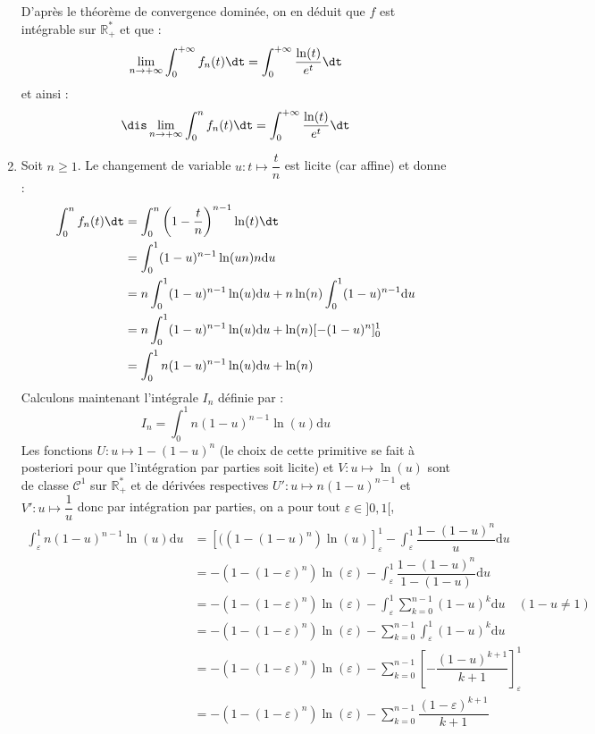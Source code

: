 \documentclass[a4paper,10pt]{report}
\begin{document}
\begin{enumerate}
\begin{itemize}
\end{itemize}
D'après le théorème de convergence dominée, on en déduit que $f$ est intégrable sur $\mathbb{R}_+^{*}$ et que :
$$ \lim_{n \rightarrow + \infty} \int_{0}^{+ \infty} f_n(t) \dt = \int_{0}^{+ \infty} \dfrac{\ln(t)}{e^t} \dt$$
et ainsi :
$$\dis \lim_{n \rightarrow + \infty} \int_{0}^n f_n(t) \dt = \int_{0}^{+ \infty} \dfrac{\ln(t)}{e^t} \dt$$
\item Soit $n \geq 1$. Le changement de variable $u : t \mapsto \dfrac{t}{n}$ est licite (car affine) et donne :
\begin{align*}
\int_{0}^n f_n(t) \dt & = \int_{0}^n \left(1 - \dfrac{t}{n}\right)^{n-1} \ln(t) \dt \\
& = \int_{0}^1  (1-u)^{n-1} \ln(un) n \textrm{d}u \\
& = n \int_{0}^1  (1-u)^{n-1} \ln(u) \textrm{d}u  +  n\ln(n) \int_{0}^1  (1-u)^{n-1} \textrm{d}u \\
& = n \int_{0}^1  (1-u)^{n-1} \ln(u) \textrm{d}u +  \ln(n) [-(1-u)^n ]_0^1 \\
& =  \int_{0}^1 n (1-u)^{n-1} \ln(u) \textrm{d}u +  \ln(n) 
\end{align*}
Calculons maintenant l'intégrale $I_n$ définie par :
$$ I_n = \int_{0}^1  n(1-u)^{n-1} \ln(u) \textrm{d}u$$
Les fonctions $U : u \mapsto 1-(1-u)^n$ (le choix de cette primitive se fait à posteriori pour que l'intégration par parties soit licite) et $V : u \mapsto \ln(u)$ sont de classe $\mathcal{C}^1$ sur $\mathbb{R}_+^{*}$ et de dérivées respectives $U' : u \mapsto n(1-u)^{n-1}$ et $V' : u \mapsto \dfrac{1}{u}$ donc par intégration par parties, on a pour tout $\varepsilon \in ]0,1[$,
\begin{align*}
 \int_{\varepsilon}^1 n (1-u)^{n-1} \ln(u) \textrm{d}u & = [((1-(1-u)^n)\ln(u)]_{\varepsilon}^1 - \int_{\varepsilon}^1 \dfrac{1-(1-u)^n}{u} \textrm{d}u \\
 & = -(1-(1- \varepsilon)^n)\ln(\varepsilon) - \int_{\varepsilon}^1 \dfrac{1-(1-u)^n}{1-(1-u)} \textrm{d}u \\ 
 & = -(1-(1- \varepsilon)^n)\ln(\varepsilon)  - \int_{\varepsilon}^1  \sum_{k=0}^{n-1} (1-u)^k \textrm{d}u  \quad (1-u \neq 1) \\ 
 & = -(1-(1- \varepsilon)^n)\ln(\varepsilon)  - \sum_{k=0}^{n-1} \int_{\varepsilon}^1   (1-u)^k \textrm{d}u \\ 
 & = -(1-(1- \varepsilon)^n)\ln(\varepsilon)  - \sum_{k=0}^{n-1} \left[ -\dfrac{(1-u)^{k+1}}{k+1}\right]_{\varepsilon}^1 \\
 & = -(1-(1- \varepsilon)^n)\ln(\varepsilon)  - \sum_{k=0}^{n-1} \dfrac{(1-\varepsilon)^{k+1}}{k+1} 

\end{align*}
\end{enumerate}
\end{document}
